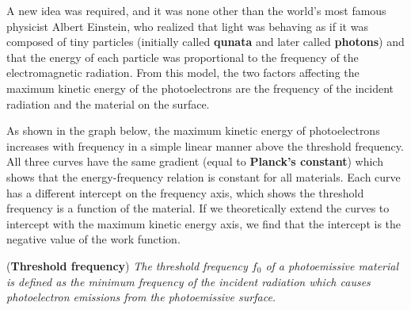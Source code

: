 A new idea was required, and it was none other than the world's most famous physicist Albert Einstein, who realized that light was behaving as if it was composed of tiny particles (initially called \textbf{qunata} and later called \textbf{photons}) and that the energy of each particle was proportional to the frequency of the electromagnetic radiation. From this model, the two factors affecting the maximum kinetic energy of the photoelectrons are the frequency of the incident radiation and the material on the surface. 

As shown in the graph below, the maximum kinetic energy of photoelectrons increases with frequency in a simple linear manner above the threshold frequency. All three curves have the same gradient (equal to \textbf{Planck's constant}) which shows that the energy-frequency relation is constant for all materials. Each curve has a different intercept on the frequency axis, which shows the threshold frequency is a function of the material. If we theoretically extend the curves to intercept with the maximum kinetic energy axis, we find that the intercept is the negative value of the work function. 

\begin{figure}[h!]
    \centering
\end{figure}
\FloatBarrier

\begin{definition}{(\textbf{Threshold frequency})}
\textit{The threshold frequency $f_0$ of a photoemissive material is defined as the minimum frequency of the incident radiation which causes photoelectron emissions from the photoemissive surface.}
\end{definition}

